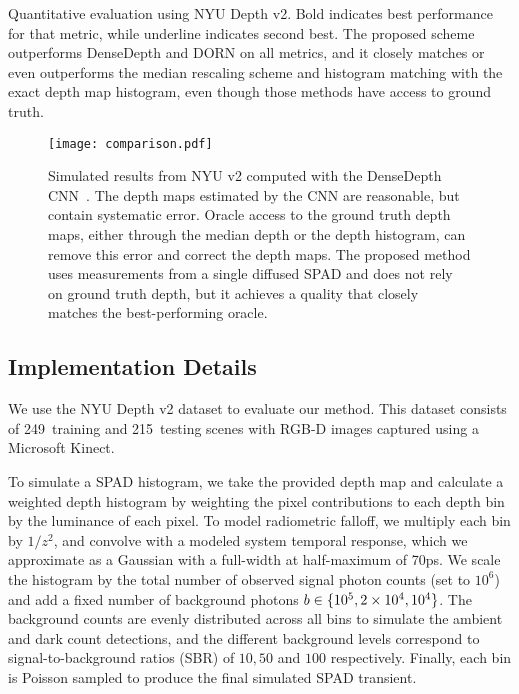 \begin{table*}[!t]
\begin{center}

\caption{Quantitative evaluation using NYU Depth v2. Bold indicates best
performance for that metric, while underline indicates second best. The proposed
scheme outperforms DenseDepth and DORN on all metrics, and it closely matches or
even outperforms the median rescaling scheme and histogram matching with the
exact depth map histogram, even though those methods have access to ground truth. }
\label{tab:comparison}
\end{center}
\end{table*}

\begin{figure*}[!h]
  \texttt{[image: comparison.pdf]}
  \caption{Simulated results from NYU v2 computed with the DenseDepth
  CNN~\cite{Alhashim2018}. The depth maps estimated by the CNN are reasonable,
  but contain systematic error. Oracle access to the ground truth depth maps,
  either through the median depth or the depth histogram, can remove this error
  and correct the depth maps. The proposed method uses measurements from a single diffused SPAD and does not rely on ground truth depth, but it achieves a quality that closely matches the best-performing oracle.}
	\label{fig:results_simulated}
\end{figure*}


\subsection{Implementation Details}

We use the NYU Depth v2 dataset to evaluate our method. This dataset consists of
249~training and 215~testing scenes with RGB-D images captured using a Microsoft
Kinect.

To simulate a SPAD histogram, we take the provided depth map and 
calculate a weighted depth histogram by weighting the pixel contributions to
each depth bin by the luminance of each pixel. To model radiometric falloff, we
multiply each bin by $1/z^2$, and convolve with a modeled system temporal
response, which we approximate as a Gaussian with a full-width at half-maximum of 70ps. We scale
the histogram by the total number of observed signal photon counts (set to 
$10^6$) and  add a fixed number of background photons $b \in \{10^5, 2\times
10^4, 10^4\}$. The background counts are evenly distributed across all bins to simulate the ambient and dark
count detections, and the different background levels correspond to
signal-to-background ratios (SBR) of $10, 50$ and $100$ respectively. Finally,
each bin is Poisson sampled to produce the final simulated SPAD transient.

